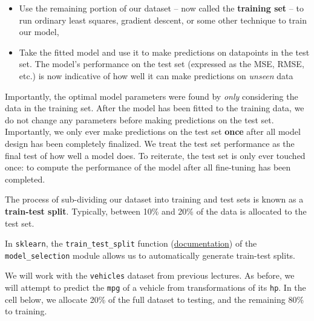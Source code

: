 \documentclass[
  letterpaper,
  DIV=11,
  numbers=noendperiod]{scrreprt}
\providecommand{\tightlist}{%
  \setlength{\itemsep}{0pt}\setlength{\parskip}{0pt}}\usepackage{longtable,booktabs,array}
\begin{document}
\begin{itemize}
\tightlist
\item
  Use the remaining portion of our dataset -- now called the
  \textbf{training set} -- to run ordinary least squares, gradient
  descent, or some other technique to train our model,
\item
  Take the fitted model and use it to make predictions on datapoints in
  the test set. The model's performance on the test set (expressed as
  the MSE, RMSE, etc.) is now indicative of how well it can make
  predictions on \emph{unseen} data
\end{itemize}

Importantly, the optimal model parameters were found by \emph{only}
considering the data in the training set. After the model has been
fitted to the training data, we do not change any parameters before
making predictions on the test set. Importantly, we only ever make
predictions on the test set \textbf{once} after all model design has
been completely finalized. We treat the test set performance as the
final test of how well a model does. To reiterate, the test set is only
ever touched once: to compute the performance of the model after all
fine-tuning has been completed.

The process of sub-dividing our dataset into training and test sets is
known as a \textbf{train-test split}. Typically, between 10\% and 20\%
of the data is allocated to the test set.

In \texttt{sklearn}, the \texttt{train\_test\_split} function
(\href{https://scikit-learn.org/stable/modules/generated/sklearn.model_selection.train_test_split.html}{documentation})
of the \texttt{model\_selection} module allows us to automatically
generate train-test splits.

We will work with the \texttt{vehicles} dataset from previous lectures.
As before, we will attempt to predict the \texttt{mpg} of a vehicle from
transformations of its \texttt{hp}. In the cell below, we allocate 20\%
of the full dataset to testing, and the remaining 80\% to training.
\end{document}

